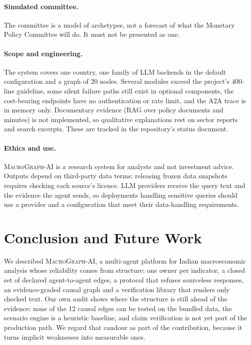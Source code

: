 \documentclass[conference]{IEEEtran}
\newcommand{\sys}{\textsc{MacroGraph-AI}}
\begin{document}
\paragraph{Simulated committee.}
The committee is a model of archetypes, not a forecast of what the Monetary Policy Committee will do. It must not be presented as one.

\paragraph{Scope and engineering.}
The system covers one country, one family of LLM backends in the default configuration and a graph of 20 nodes. Several modules exceed the project's 400-line guideline, some silent failure paths still exist in optional components, the cost-bearing endpoints have no authentication or rate limit, and the A2A trace is in memory only. Documentary evidence (RAG over policy documents and minutes) is not implemented, so qualitative explanations rest on sector reports and search excerpts. These are tracked in the repository's status document.

\paragraph{Ethics and use.}
\sys{} is a research system for analysts and not investment advice. Outputs depend on third-party data terms; releasing frozen data snapshots requires checking each source's licence. LLM providers receive the query text and the evidence the agent sends, so deployments handling sensitive queries should use a provider and a configuration that meet their data-handling requirements.

\section{Conclusion and Future Work}
\label{sec:conclusion}

We described \sys{}, a multi-agent platform for Indian macroeconomic analysis whose reliability comes from structure: one owner per indicator, a closed set of declared agent-to-agent edges, a protocol that refuses sourceless responses, an evidence-graded causal graph and a verification library that renders only checked text. Our own audit shows where the structure is still ahead of the evidence: none of the 12 causal edges can be tested on the bundled data, the scenario engine is a heuristic baseline, and claim verification is not yet part of the production path. We regard that candour as part of the contribution, because it turns implicit weaknesses into measurable ones.
\end{document}

